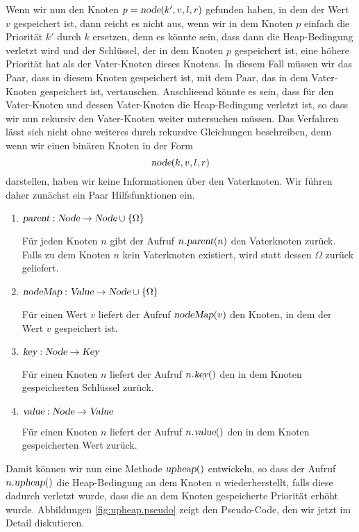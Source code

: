 Wenn wir nun den Knoten $p = \textsl{node}(k',v,l,r)$ gefunden haben, in dem der Wert $v$
gespeichert ist, dann reicht es nicht aus, wenn wir in dem Knoten $p$ einfach die Priorit\"at $k'$
durch $k$ ersetzen, denn es k\"onnte sein, dass dann die Heap-Bedingung verletzt wird und
der Schl\"ussel, der in dem Knoten $p$ gespeichert ist, eine h\"ohere Priorit\"at hat als der
Vater-Knoten dieses Knotens.  In diesem Fall m\"ussen wir das Paar, dass in diesem Knoten
gespeichert ist, mit dem Paar, das in dem Vater-Knoten gespeichert ist, vertauschen.
Anschlie\3end k\"onnte es sein, dass f\"ur den Vater-Knoten und dessen Vater-Knoten die
Heap-Bedingung verletzt ist, so dass wir nun rekursiv den Vater-Knoten weiter untersuchen
m\"ussen.  Das Verfahren l\"asst sich nicht ohne weiteres durch rekursive Gleichungen
beschreiben, denn wenn wir einen bin\"aren Knoten in der Form
\[ \textsl{node}(k,v,l,r) \]
darstellen, haben wir keine Informationen \"uber den Vaterknoten.  Wir f\"uhren daher zun\"achst
ein Paar Hilfsfunktionen ein.
\begin{enumerate}
\item $\textsl{parent}: \textsl{Node} \rightarrow \textsl{Node} \cup \{ \Omega \}$

      F\"ur jeden Knoten $n$ gibt der Aufruf $n.\textsl{parent}(n)$ den Vaterknoten zur\"uck.
      Falls zu dem Knoten $n$ kein Vaterknoten existiert, wird statt dessen $\Omega$
      zur\"uck geliefert.
\item $\textsl{nodeMap}: \textsl{Value} \rightarrow \textsl{Node} \cup \{ \Omega \}$

      F\"ur einen Wert $v$ liefert der Aufruf $\textsl{nodeMap}(v)$ den Knoten, in dem der Wert
      $v$ gespeichert ist.
\item $\textsl{key}: \textsl{Node} \rightarrow \textsl{Key}$

      F\"ur einen Knoten $n$ liefert der Aufruf $n.\textsl{key}()$ den in dem Knoten
      gespeicherten Schl\"ussel zur\"uck.

\item $\textsl{value}: \textsl{Node} \rightarrow \textsl{Value}$

      F\"ur einen Knoten $n$ liefert der Aufruf $n.\textsl{value}()$ den in dem Knoten
      gespeicherten Wert zur\"uck.
\end{enumerate}
Damit k\"onnen wir nun eine Methode $\textsl{upheap}()$ entwickeln, so dass der Aufruf
$n.\textsl{upheap}()$ die Heap-Bedingung an dem Knoten $n$ wiederherstellt, falls diese
dadurch verletzt wurde, dass die an dem Knoten gespeicherte Priorit\"at erh\"oht wurde.
Abbildungen \ref{fig:upheap.pseudo} zeigt den Pseudo-Code, den wir jetzt im Detail diskutieren.

